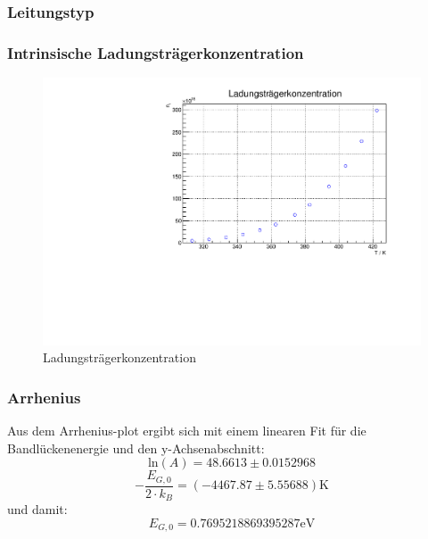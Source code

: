 \subsubsection{Leitungstyp}
\FloatBarrier


\subsubsection{Intrinsische Ladungsträgerkonzentration}
\FloatBarrier

\begin{figure}
\label{fig:leitin}
\centering
\includegraphics[scale = 0.5]{../data/A4.pdf}
\caption{Ladungsträgerkonzentration}
\end{figure}



\subsubsection{Arrhenius}
\FloatBarrier

Aus dem Arrhenius-plot ergibt sich mit einem linearen Fit für die Bandlückenenergie und den y-Achsenabschnitt:
$$\text{ln}(A) = 48.6613 \pm 0.0152968 $$
$$ - \frac{E_{G,0}}{2 \cdot k_B} = (-4467.87 \pm 5.55688 )  \text{K}$$
und damit:
$$E_{G,0} = 0.7695218869395287 \text{eV} $$

